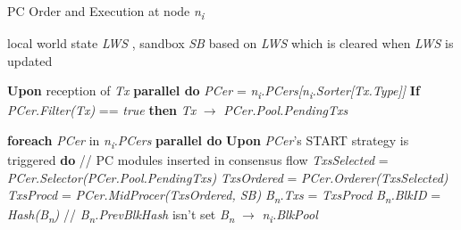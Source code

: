 \documentclass[journal]{IEEEtran}
\begin{document}
\begin{algorithm}
\caption{PC Order and Execution at node \textit{n\textsubscript{i}}}
\begin{algorithmic}[1]

\Require \footnotesize local world state \normalsize \textit{LWS} \footnotesize, sandbox \normalsize \textit{SB} \footnotesize based on \textit{LWS} which is cleared when \textit{LWS} is updated \normalsize

\State \textbf{Upon} reception of \textit{Tx} \textbf{parallel do}
    \State \hspace{5mm} \textit{PCer} = \textit{n\textsubscript{i}.PCers[n\textsubscript{i}.Sorter[Tx.Type]]}
    \State \hspace{5mm} \textbf{If} \textit{PCer.Filter(Tx)} == \textit{true} \textbf{then}
        \State \hspace{10mm} \textit{Tx} $\rightarrow{}$ \textit{PCer.Pool.PendingTxs}
        
\State \textbf{foreach} \textit{PCer} in \textit{n\textsubscript{i}.PCers} \textbf{parallel do}
    \State \hspace{5mm} \textbf{Upon} \textit{PCer}’s START strategy is triggered \textbf{do}
        \State \hspace{10mm} \footnotesize // PC modules inserted in consensus flow \normalsize
        \State \hspace{10mm} \textit{TxsSelected} = \textit{PCer.Selector(PCer.Pool.PendingTxs)}
        \State \hspace{10mm} \textit{TxsOrdered} = \textit{PCer.Orderer(TxsSelected)}
        \State \hspace{10mm} \textit{TxsProcd} = \textit{PCer.MidProcer(TxsOrdered, SB)}
        \State \hspace{10mm} \textit{B\textsubscript{n}.Txs} = \textit{TxsProcd}
        \State \hspace{10mm} \textit{B\textsubscript{n}.BlkID} = \textit{Hash(B\textsubscript{n})} \footnotesize // \textit{B\textsubscript{n}.PrevBlkHash} isn't set \normalsize
        \State \hspace{10mm} \textit{B\textsubscript{n}} $\rightarrow{}$ \textit{n\textsubscript{i}.BlkPool}

\end{algorithmic}
\end{algorithm}
\end{document}
